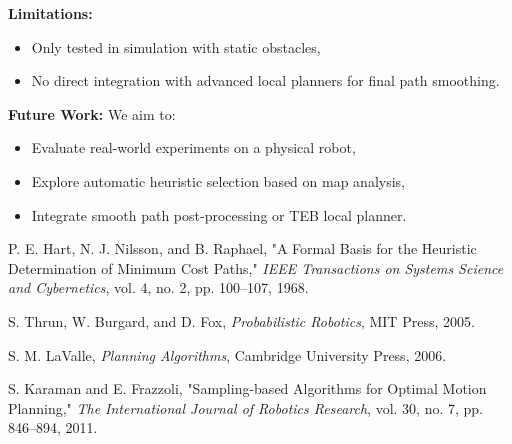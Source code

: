 \documentclass[letterpaper, 10 pt, conference]{ieeeconf}
\begin{document}
\textbf{Limitations:} 
\begin{itemize}
    \item Only tested in simulation with static obstacles,
    \item No direct integration with advanced local planners for final path smoothing.
\end{itemize}

\textbf{Future Work:} 
We aim to:
\begin{itemize}
    \item Evaluate real-world experiments on a physical robot,
    \item Explore automatic heuristic selection based on map analysis,
    \item Integrate smooth path post-processing or TEB local planner.
\end{itemize}




% 
\begin{thebibliography}{1}

 P. E. Hart, N. J. Nilsson, and B. Raphael, "A Formal Basis for the Heuristic Determination of Minimum Cost Paths," \textit{IEEE Transactions on Systems Science and Cybernetics}, vol. 4, no. 2, pp. 100--107, 1968.

 S. Thrun, W. Burgard, and D. Fox, \textit{Probabilistic Robotics}, MIT Press, 2005.

 S. M. LaValle, \textit{Planning Algorithms}, Cambridge University Press, 2006.

 S. Karaman and E. Frazzoli, "Sampling-based Algorithms for Optimal Motion Planning," \textit{The International Journal of Robotics Research}, vol. 30, no. 7, pp. 846--894, 2011.

\end{thebibliography}
\end{document}
